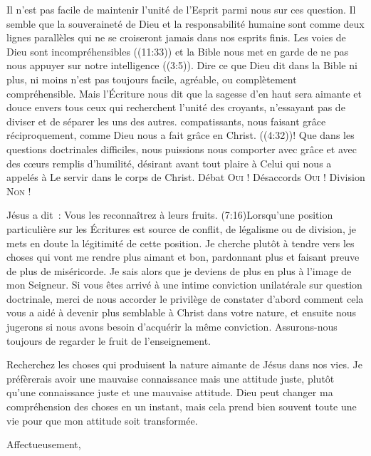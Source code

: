 \begin{specialpar}{}
Il n'est pas facile de maintenir l'unité de l'Esprit parmi nous sur ces question.
 Il semble que la souveraineté de Dieu et la responsabilité humaine
 sont comme deux lignes parallèles qui ne se croiseront jamais dans nos esprits finis.
 Les voies de Dieu sont \og incompréhensibles \fg{} ((11:33))
 et la Bible nous met en garde de \og ne pas nous appuyer sur notre intelligence \fg{}
 ((3:5)).
 Dire ce que Dieu dit dans la Bible \ocadr ni plus, ni moins \fcadr{} n'est pas
 toujours facile, agréable, ou complètement compréhensible.
 Mais l'Écriture nous dit que la sagesse d'en haut sera aimante
 et douce envers tous ceux qui recherchent l'unité des croyants,
 n'essayant pas de diviser et de séparer les uns des autres.
 compatissants, nous faisant grâce réciproquement,
 comme Dieu nous a fait grâce en Christ. ((4:32))!
 Que dans les questions doctrinales difficiles, nous puissions nous comporter
 avec grâce et avec des cœurs remplis d'humilité, désirant avant tout
 plaire à Celui qui nous a appelés à Le servir dans le corps de Christ.
 Débat \ocadr \textsc{Oui} !
 Désaccords \ocadr \textsc{Oui} !
 Division \ocadr \textsc{Non} !
\end{specialpar}

Jésus a dit~: \og Vous les reconnaîtrez à leurs fruits. \fg{}
 (7:16)Lorsqu'une position particulière
 sur les Écritures est source de conflit, de légalisme ou de division,
 je mets en doute la légitimité de cette position.
 Je cherche plutôt à tendre vers les choses qui vont me rendre plus aimant et bon,
 pardonnant plus et faisant preuve de plus de miséricorde.
 Je sais alors que je deviens de plus en plus à l'image de mon Seigneur.
Si vous êtes arrivé à une intime conviction unilatérale sur question doctrinale,
 merci de nous accorder le privilège de constater d'abord comment cela
 vous a aidé à devenir plus semblable à Christ dans votre nature,
 et ensuite nous jugerons si nous avons besoin d'acquérir la même conviction.
 Assurons-nous toujours de regarder le fruit de l'enseignement.

\begin{specialpar}{}
Recherchez les choses qui produisent la nature aimante de Jésus dans nos vies.
 \pocketlinebreak
 Je préfèrerais avoir une mauvaise connaissance mais une attitude juste,
 plutôt qu'une connaissance juste et une mauvaise attitude.
 Dieu peut changer ma compréhension des choses en un instant,
 mais cela prend bien souvent toute une vie pour que mon attitude
 soit transformée.
\end{specialpar}


Affectueusement,

\signature{Chuck Smith}


\closechapter

